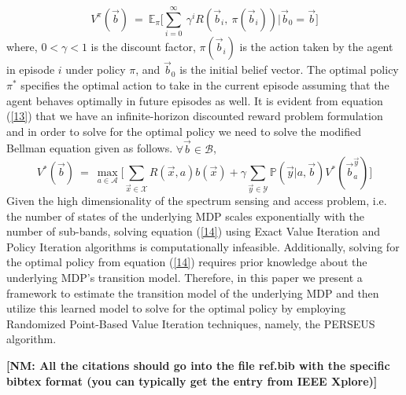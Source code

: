 \documentclass[10pt,twocolumn]{IEEEtran}
\newcommand{\nm}[1]{{\color{blue}\bf{[NM: #1]}}}
\begin{document}
\begin{equation}\label{13}
    V^{\pi}(\vec{b})\ =\ \mathbb{E}_{\pi}\Big[\sum_{i=0}^{\infty}\ \gamma^i R(\vec{b}_i,\ \pi(\vec{b}_i))|\vec{b}_0=\vec{b}\Big]
\end{equation}
where, $0 < \gamma < 1$ is the discount factor, $\pi(\vec{b}_i)$ is the action taken by the agent in episode $i$ under policy $\pi$, and $\vec{b}_0$ is the initial belief vector. The optimal policy $\pi^*$ specifies the optimal action to take in the current episode assuming that the agent behaves optimally in future episodes as well. It is evident from equation (\ref{13}) that we have an infinite-horizon discounted reward problem formulation and in order to solve for the optimal policy we need to solve the modified Bellman equation given as follows. $\forall \vec{b} \in \mathcal{B}$,
\begin{equation}\label{14}
    V^*(\vec{b})\ =\ \max_{a \in \mathcal{A}}\Big[\sum_{\vec{x} \in \mathcal{X}}R(\vec{x},a)b(\vec{x}) + \gamma \sum_{\vec{y} \in \mathcal{Y}}\mathbb{P}(\vec{y}|a,\vec{b})V^*(\vec{b}_a^{\vec{y}})\Big]
\end{equation}
Given the high dimensionality of the spectrum sensing and access problem, i.e. the number of states of the underlying MDP scales exponentially with the number of sub-bands, solving equation (\ref{14}) using Exact Value Iteration and Policy Iteration algorithms is computationally infeasible. Additionally, solving for the optimal policy from equation (\ref{14}) requires prior knowledge about the underlying MDP's transition model. Therefore, in this paper we present a framework to estimate the transition model of the underlying MDP and then utilize this learned model to solve for the optimal policy by employing Randomized Point-Based Value Iteration techniques, namely, the PERSEUS algorithm.

\nm{All the citations should go into the file ref.bib with the specific bibtex format (you can typically get the entry from IEEE Xplore)}

 
\end{document}

